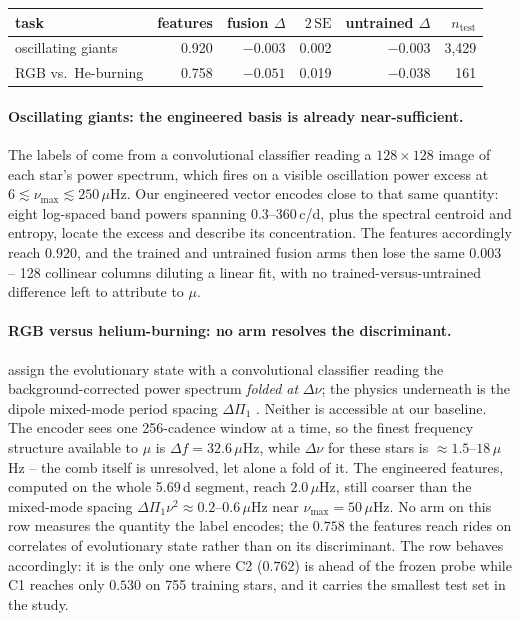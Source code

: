 \documentclass{article}
\begin{document}
\begin{center}
\small
\begin{tabular}{lrrrrr}
\toprule
task & features & fusion $\Delta$ & $2\,\mathrm{SE}$ & untrained $\Delta$ & $n_{\mathrm{test}}$ \\
\midrule
oscillating giants & 0.920 & $-0.003$ & 0.002 & $-0.003$ & 3{,}429 \\
RGB vs.\ He-burning & 0.758 & $-0.051$ & 0.019 & $-0.038$ & 161 \\
\bottomrule
\end{tabular}
\end{center}

\paragraph{Oscillating giants: the engineered basis is already near-sufficient.} The labels of
\citet{hon2021} come from a convolutional classifier reading a $128 \times 128$ image of each star's
power spectrum, which fires on a visible oscillation power excess at
$6 \lesssim \nu_{\max} \lesssim 250\,\mu$Hz. Our engineered vector encodes close to that same
quantity: eight log-spaced band powers spanning 0.3--360\,c/d, plus the spectral centroid and
entropy, locate the excess and describe its concentration. The features accordingly reach $0.920$,
and the trained and untrained fusion arms then lose the same $0.003$ -- 128 collinear columns
diluting a linear fit, with no trained-versus-untrained difference left to attribute to $\mu$.

\paragraph{RGB versus helium-burning: no arm resolves the discriminant.} \citet{sreenivas2026} assign
the evolutionary state with a convolutional classifier reading the background-corrected power spectrum
\emph{folded at} $\Delta\nu$; the physics underneath is the dipole mixed-mode period spacing
$\Delta\Pi_{1}$ \citep{bedding2011}. Neither is accessible at our baseline. The encoder sees one
256-cadence window at a time, so the finest frequency structure available to $\mu$ is
$\Delta f = 32.6\,\mu$Hz, while $\Delta\nu$ for these stars is $\approx 1.5$--$18\,\mu$Hz -- the comb
itself is unresolved, let alone a fold of it. The engineered features, computed on the whole 5.69\,d
segment, reach $2.0\,\mu$Hz, still coarser than the mixed-mode spacing
$\Delta\Pi_{1}\nu^{2} \approx 0.2$--$0.6\,\mu$Hz near $\nu_{\max} = 50\,\mu$Hz. No arm on this row
measures the quantity the label encodes; the $0.758$ the features reach rides on correlates of
evolutionary state rather than on its discriminant. The row behaves accordingly: it is the only one
where C2 ($0.762$) is ahead of the frozen probe while C1 reaches only $0.530$ on 755 training stars,
and it carries the smallest test set in the study.
\end{document}

